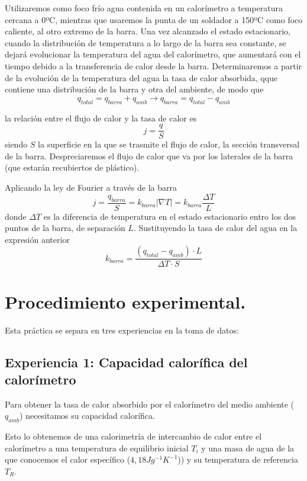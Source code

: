 \documentclass[a4paper,12pt,spanish]{article}
\begin{document}
	Utilizaremos como foco frío agua contenida en un calorímetro a temperatura cercana a 0ºC, mientras que usaremos la punta de un soldador a 150ºC como foco caliente, al otro extremo de la barra. Una vez alcanzado el estado estacionario, cuando la distribución de temperatura a lo largo de la barra sea constante, se dejará evolucionar la temperatura del agua del calorímetro, que aumentará con el tiempo debido a la transferencia de calor desde la barra.
	Determinaremos a partir de la evolución de la temperatura del agua la tasa de calor absorbida, qque contiene una distribución de la barra y otra del ambiente, de modo que 
	\[ q_{total} = q_{barra} + q_{amb} \rightarrow q_{barra}= q_{total} - q_{amb}
	\]
	
	la relación entre el flujo de calor y la tasa de calor es 
	\[j = \frac{q}{S}	\]
	siendo $S$ la superficie en la que se trasmite el flujo de calor, la sección transversal de la barra. Despreciaremos el flujo de calor que va por los laterales de la barra (que estarán recubiertos de plástico).
	
	Aplicando la ley de Fourier a través de la barra
	\[ j = \frac{q_{barra}}{S} = k_{barra} |\nabla T | = k_{barra} \frac{\Delta T}{L}
	\]
	donde $\Delta T$ es la diferencia de temperatura en el estado estacionario entro los dos puntos de la barra, de separación $L$. Sustituyendo la tasa de calor del agua en la expresión anterior
	\[ k_{barra} = \frac{(q_{total}-q_{amb})\cdot L}{\Delta T\cdot S}
	\]
	
	
	
	\section{Procedimiento experimental.}
	
	
	Esta práctica se separa en tres experiencias en la toma de datos:
	
	\subsection{Experiencia 1: Capacidad calorífica del calorímetro}
	
	Para obtener la tasa de calor absorbido por el calorímetro del medio ambiente ($q_{amb}$) necesitamos su capacidad calorífica.
	
	Esto lo obtenemos de una calorimetría de intercambio de calor entre el calorímetro a una temperatura de equilibrio inicial $T_i$ y una masa de agua de la que conocemos el calor específico ($4,18 \si{Jg^{-1}K^{-1}}$)) y su temperatura de referencia $T_R$. 
	
\end{document}
